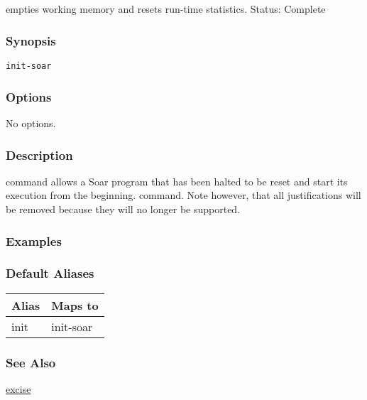 \subsection{}
\label{init-soar}
empties working memory and resets run-time statistics. 
 Status: Complete
\subsubsection*{Synopsis}
\begin{verbatim}
init-soar
\end{verbatim}
\subsubsection*{Options}
 No options. 
\subsubsection*{Description}
 command allows a Soar program that has been halted to be reset and start its execution from the beginning. 
 command. Note however, that all justifications will be removed because they will no longer be supported. 
\subsubsection*{Examples}
\subsubsection*{Default Aliases}
\begin{tabular}{|l|l|}
\hline 
 Alias  & Maps to  \\
 \hline 
 init  & init-soar  \\
 \hline 
\end{tabular}
\subsubsection*{See Also}
\hyperref[excise]{excise} 